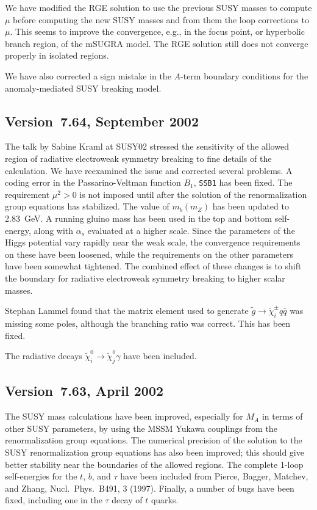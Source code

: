 We have modified the RGE solution to use the previous SUSY masses to
compute $\mu$ before computing the new SUSY masses and from them the
loop corrections to $\mu$. This seems to improve the convergence, e.g.,
in the focus point, or hyperbolic branch region, of the mSUGRA model. 
The RGE solution still does not converge properly in isolated regions.

We have also corrected a sign mistake in the $A$-term boundary
conditions for the anomaly-mediated SUSY breaking model.

\subsection{Version~7.64, September 2002}

     The talk by Sabine Kraml at SUSY02 stressed the sensitivity of the
allowed region of radiative electroweak symmetry breaking to fine
details of the calculation. We have reexamined the issue and corrected
several problems. A coding error in the Passarino-Veltman function $B_1$,
\verb|SSB1| has been fixed. The requirement $\mu^2>0$ is not imposed
until after the solution of the renormalization group equations has
stabilized. The value of $m_b(m_Z)$ has been updated to 2.83~GeV. A
running gluino mass has been used in the top and bottom self-energy,
along with $\alpha_s$ evaluated at a higher scale. Since the parameters
of the Higgs potential vary rapidly near the weak scale, the convergence
requirements on these have been loosened, while the requirements on the
other parameters have been somewhat tightened. The combined effect of
these changes is to shift the boundary for radiative electroweak
symmetry breaking to higher scalar masses.

     Stephan Lammel found that the matrix element used to generate
$\tilde g \to \tilde\chi_i^\pm q \bar q$ was missing some poles,
although the branching ratio was correct. This has been fixed.

     The radiative decays $\tilde\chi_i^0 \to \tilde\chi_j^0 \gamma$ 
have been included.

\subsection{Version~7.63, April 2002}

     The SUSY mass calculations have been improved, especially for $M_A$
in terms of other SUSY parameters, by using the MSSM Yukawa couplings
from the renormalization group equations. The numerical precision of the
solution to the SUSY renormalization group equations has also been
improved; this should give better stability near the boundaries of the
allowed regions. The complete 1-loop self-energies for the $t$, $b$, and
$\tau$ have been included from Pierce, Bagger, Matchev, and Zhang,
Nucl.\ Phys.\ B491, 3 (1997). Finally, a number of bugs have been fixed,
including one in the $\tau$ decay of $t$ quarks.

